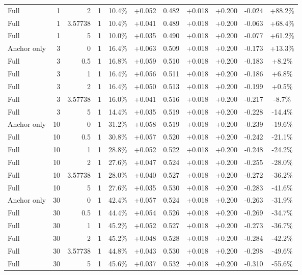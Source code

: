 \begin{table}[htbp]
\begin{tabular}{lrrrccccccc}
Full & 1 & 2 & 1 & 10.4\% & +0.052 & 0.482 & +0.018 & +0.200 & -0.024 & +88.2\% \\
Full & 1 & 3.57738 & 1 & 10.4\% & +0.041 & 0.489 & +0.018 & +0.200 & -0.063 & +68.4\% \\
Full & 1 & 5 & 1 & 10.0\% & +0.035 & 0.490 & +0.018 & +0.200 & -0.077 & +61.2\% \\
Anchor only & 3 & 0 & 1 & 16.4\% & +0.063 & 0.509 & +0.018 & +0.200 & -0.173 & +13.3\% \\
Full & 3 & 0.5 & 1 & 16.8\% & +0.059 & 0.510 & +0.018 & +0.200 & -0.183 & +8.2\% \\
Full & 3 & 1 & 1 & 16.4\% & +0.056 & 0.511 & +0.018 & +0.200 & -0.186 & +6.8\% \\
Full & 3 & 2 & 1 & 16.4\% & +0.050 & 0.513 & +0.018 & +0.200 & -0.199 & +0.5\% \\
Full & 3 & 3.57738 & 1 & 16.0\% & +0.041 & 0.516 & +0.018 & +0.200 & -0.217 & -8.7\% \\
Full & 3 & 5 & 1 & 14.4\% & +0.035 & 0.519 & +0.018 & +0.200 & -0.228 & -14.4\% \\
Anchor only & 10 & 0 & 1 & 31.2\% & +0.058 & 0.519 & +0.018 & +0.200 & -0.239 & -19.6\% \\
Full & 10 & 0.5 & 1 & 30.8\% & +0.057 & 0.520 & +0.018 & +0.200 & -0.242 & -21.1\% \\
Full & 10 & 1 & 1 & 28.8\% & +0.052 & 0.522 & +0.018 & +0.200 & -0.248 & -24.2\% \\
Full & 10 & 2 & 1 & 27.6\% & +0.047 & 0.524 & +0.018 & +0.200 & -0.255 & -28.0\% \\
Full & 10 & 3.57738 & 1 & 28.0\% & +0.040 & 0.527 & +0.018 & +0.200 & -0.272 & -36.2\% \\
Full & 10 & 5 & 1 & 27.6\% & +0.035 & 0.530 & +0.018 & +0.200 & -0.283 & -41.6\% \\
Anchor only & 30 & 0 & 1 & 42.4\% & +0.057 & 0.524 & +0.018 & +0.200 & -0.263 & -31.9\% \\
Full & 30 & 0.5 & 1 & 44.4\% & +0.054 & 0.526 & +0.018 & +0.200 & -0.269 & -34.7\% \\
Full & 30 & 1 & 1 & 45.2\% & +0.052 & 0.527 & +0.018 & +0.200 & -0.273 & -36.7\% \\
Full & 30 & 2 & 1 & 45.2\% & +0.048 & 0.528 & +0.018 & +0.200 & -0.284 & -42.2\% \\
Full & 30 & 3.57738 & 1 & 44.8\% & +0.043 & 0.530 & +0.018 & +0.200 & -0.298 & -49.6\% \\
Full & 30 & 5 & 1 & 45.6\% & +0.037 & 0.532 & +0.018 & +0.200 & -0.310 & -55.6\% \\

\end{tabular}
\end{table}

